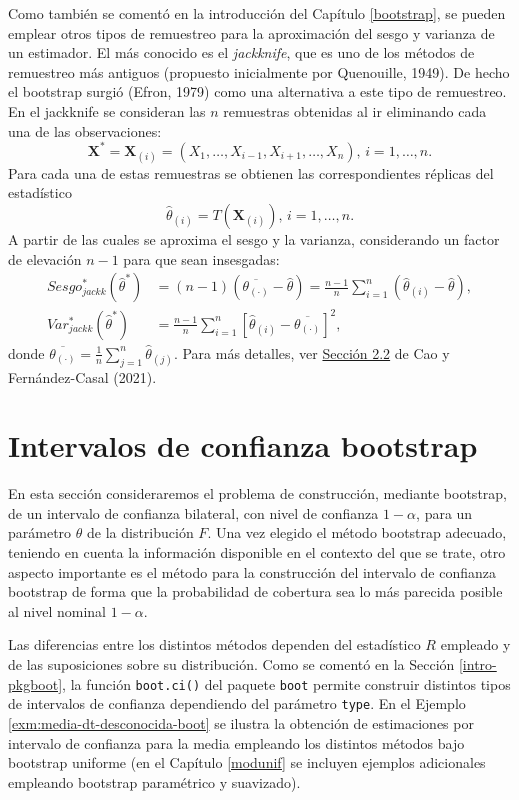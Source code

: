 \documentclass[
  10pt,
]{book}
\renewcommand{\mathbf}[1]{\symbf{#1}}
\theoremstyle{break}
\theoremstyle{nonumberplain}
\begin{document}
Como también se comentó en la introducción del Capítulo \ref{bootstrap}, se pueden emplear otros tipos de remuestreo para la aproximación del sesgo y varianza de un estimador.
El más conocido es el \emph{jackknife}, que es uno de los métodos de remuestreo más antiguos (propuesto inicialmente por Quenouille, 1949).
De hecho el bootstrap surgió (Efron, 1979) como una alternativa a este tipo de remuestreo.
En el jackknife se consideran las \(n\) remuestras obtenidas al ir eliminando cada una de las observaciones:
\[\mathbf{X}^{\ast}= \mathbf{X}_{(i)}=\left( X_1,\ldots ,X_{i-1},X_{i+1},\ldots
,X_n \right) \text{,  } i=1,\ldots ,n.\]
Para cada una de estas remuestras se obtienen las correspondientes réplicas del estadístico
\[\hat \theta_{(i)} = T \left( \mathbf{X}_{(i)} \right) \text{,  } i=1,\ldots ,n.\]
A partir de las cuales se aproxima el sesgo y la varianza, considerando un factor de elevación \(n-1\) para que sean insesgadas:
\[\begin{aligned}
Sesgo_{jackk}^{\ast}\left( \hat{\theta}^{\ast} \right) 
&= \left( n-1 \right)\left( \overline{\theta_{(\cdot)}}-\hat{\theta} \right) 
= \frac{n-1}{n}\sum_{i=1}^{n}\left( \hat \theta_{(i)} - \hat{\theta} \right), \\
Var_{jackk}^{\ast}\left( \hat{\theta}^{\ast} \right) 
&= \frac{n-1}{n} \sum_{i=1}^{n}\left[ \hat \theta_{(i)} 
- \overline{\theta_{(\cdot)}}\right]^2,
\end{aligned}\]
donde \(\overline{\theta_{(\cdot)}} = \frac{1}{n}\sum_{j=1}^{n}\hat \theta_{(j)}\).
Para más detalles, ver \href{https://rubenfcasal.github.io/book_remuestreo/jackknife.html}{Sección 2.2} de Cao y Fernández-Casal (2021).

\hypertarget{boot-ic}{%
\section{Intervalos de confianza bootstrap}\label{boot-ic}}

En esta sección consideraremos el problema de construcción, mediante bootstrap, de un intervalo de confianza bilateral, con nivel de confianza \(1-\alpha\), para un parámetro \(\theta\) de la distribución \(F\).
Una vez elegido el método bootstrap adecuado, teniendo en cuenta la información disponible en el contexto del que se trate, otro aspecto importante es el método para la construcción del intervalo de confianza bootstrap de forma que la probabilidad de cobertura sea lo más parecida posible al nivel nominal \(1-\alpha\).

Las diferencias entre los distintos métodos dependen del estadístico \(R\) empleado y de las suposiciones sobre su distribución.
Como se comentó en la Sección \ref{intro-pkgboot}, la función \texttt{boot.ci()} del paquete \texttt{boot} permite construir distintos tipos de intervalos de confianza dependiendo del parámetro \texttt{type}.
En el Ejemplo \ref{exm:media-dt-desconocida-boot} se ilustra la obtención de estimaciones por intervalo de confianza para la media empleando los distintos métodos bajo bootstrap uniforme (en el Capítulo \ref{modunif} se incluyen ejemplos adicionales empleando bootstrap paramétrico y suavizado).
\end{document}
